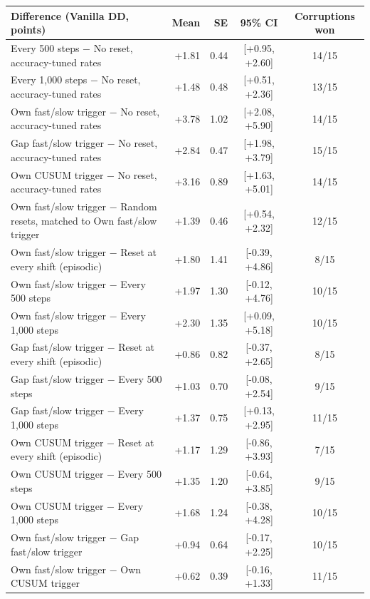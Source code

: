 \begin{table}[t]
  \centering\small
  \begin{tabular}{@{}lrrcc@{}}
    \toprule
    Difference (Vanilla DD, points) & Mean & SE & 95\% CI & Corruptions won \\
    \midrule
    Every 500 steps $-$ No reset, accuracy-tuned rates & +1.81 & 0.44 & [+0.95, +2.60] & 14/15 \\
    Every 1,000 steps $-$ No reset, accuracy-tuned rates & +1.48 & 0.48 & [+0.51, +2.36] & 13/15 \\
    Own fast/slow trigger $-$ No reset, accuracy-tuned rates & +3.78 & 1.02 & [+2.08, +5.90] & 14/15 \\
    Gap fast/slow trigger $-$ No reset, accuracy-tuned rates & +2.84 & 0.47 & [+1.98, +3.79] & 15/15 \\
    Own CUSUM trigger $-$ No reset, accuracy-tuned rates & +3.16 & 0.89 & [+1.63, +5.01] & 14/15 \\
    Own fast/slow trigger $-$ Random resets, matched to Own fast/slow trigger & +1.39 & 0.46 & [+0.54, +2.32] & 12/15 \\
    Own fast/slow trigger $-$ Reset at every shift (episodic) & +1.80 & 1.41 & [-0.39, +4.86] & 8/15 \\
    Own fast/slow trigger $-$ Every 500 steps & +1.97 & 1.30 & [-0.12, +4.76] & 10/15 \\
    Own fast/slow trigger $-$ Every 1,000 steps & +2.30 & 1.35 & [+0.09, +5.18] & 10/15 \\
    Gap fast/slow trigger $-$ Reset at every shift (episodic) & +0.86 & 0.82 & [-0.37, +2.65] & 8/15 \\
    Gap fast/slow trigger $-$ Every 500 steps & +1.03 & 0.70 & [-0.08, +2.54] & 9/15 \\
    Gap fast/slow trigger $-$ Every 1,000 steps & +1.37 & 0.75 & [+0.13, +2.95] & 11/15 \\
    Own CUSUM trigger $-$ Reset at every shift (episodic) & +1.17 & 1.29 & [-0.86, +3.93] & 7/15 \\
    Own CUSUM trigger $-$ Every 500 steps & +1.35 & 1.20 & [-0.64, +3.85] & 9/15 \\
    Own CUSUM trigger $-$ Every 1,000 steps & +1.68 & 1.24 & [-0.38, +4.28] & 10/15 \\
    Own fast/slow trigger $-$ Gap fast/slow trigger & +0.94 & 0.64 & [-0.17, +2.25] & 10/15 \\
    Own fast/slow trigger $-$ Own CUSUM trigger & +0.62 & 0.39 & [-0.16, +1.33] & 11/15 \\

\end{tabular}
\end{table}
